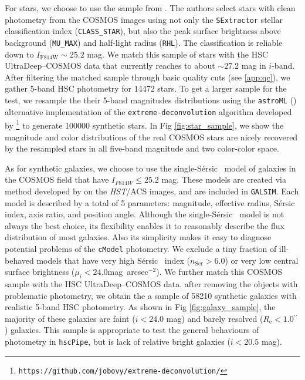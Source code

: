 \documentclass[useamsfonts]{pasj01}
\def\asec{$^{\prime\prime}$}
\def\sb{mag~arcsec$^{-2}$}
\def\ser{{S\'{e}rsic\ }}
\def\hscpipe{\texttt{hscPipe}}
\def\cmodel{\texttt{cModel}}
\def\galsim{\texttt{G}{\scriptsize \texttt{AL}}\texttt{S}{\scriptsize \texttt{IM}}}
\begin{document}
    For stars, we choose to use the sample from \citet{Leauthaud2007}.
    The authors select stars with clean photometry from the COSMOS images using not
    only the \texttt{SExtractor} stellar classification index (\texttt{CLASS\_STAR}),
    but also the peak surface brightness above background (\texttt{MU\_MAX}) and
    half-light radius (\texttt{RHL}).
    The classification is reliable down to $I_{\mathrm{F814W}}{\sim}25.2$ mag.
    We match this sample of stars with the HSC UltraDeep--COSMOS data that currently
    reaches to about ${\sim}27.2$ mag in $i$-band.
    After filtering the matched sample through basic quality cuts (see \ref{app:qc}),
    we gather 5-band HSC photometry for 14472 stars.
    To get a larger sample for the test, we resample the their 5-band magnitudes
    distributions using the \texttt{astroML} (\citealt{astroml}) alternative
    implementation of the \texttt{extreme-deconvolution} algorithm developed by
    \citet{Bovy2011}
    \footnote{\texttt{https://github.com/jobovy/extreme-deconvolution/}} to
    generate 100000 synthetic stars.
    In Fig \ref{fig:star_sample}, we show the magnitude and color distributions of
    the real COSMOS stars are nicely recovered by the resampled stars in all
    five-band magnitude and two color-color space.

    As for synthetic galaxies, we choose to use the single-\ser{} model of galaxies
    in the COSMOS field that have $I_{F814W} \leq 25.2$ mag.
    These models are created via method developed by \citet{Lackner2012} on the
    \textit{HST}/ACS images, and are included in \galsim{}.
    Each model is described by a total of 5 parameters: magnitude, effective radius,
    \ser{} index, axis ratio, and position angle.
    Although the single-\ser{} model is not always the best choice, its flexibility
    enables it to reasonably describe the flux distribution of most galaxies.
    Also its simplicity makes it easy to diagnose potential problems of the
    \cmodel{} photometry.
    We exclude a tiny fraction of ill-behaved models that have very high \ser{}
    index ($n_{\mathrm{Ser}} > 6.0$) or very low central surface brightness
    ($\mu_{i} < 24.0$\sb).
    We further match this COSMOS sample with the HSC UltraDeep--COSMOS data.
    after removing the objects with problematic photometry, we obtain the a sample of
    58210 synthetic galaxies with realistic 5-band HSC photometry.
    As shown in Fig \ref{fig:galaxy_sample}, the majority of these galaxies are
    faint ($i<24.0$ mag) and barely resolved ($R_{\mathrm{e}}< 1.0$\asec) galaxies.
    This sample is appropriate to test the general behaviours of photometry in
    \hscpipe{}, but is lack of relative bright galaxies ($i<20.5$ mag).
\end{document}
